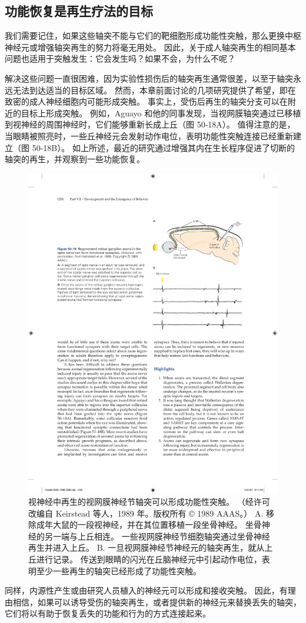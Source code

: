 \subsection{功能恢复是再生疗法的目标}
我们需要记住，如果这些轴突不能与它们的靶细胞形成功能性突触，那么更换中枢神经元或增强轴突再生的努力将毫无用处。 因此，关于成人轴突再生的相同基本问题也适用于突触发生：它会发生吗？如果不会，为什么不呢？

解决这些问题一直很困难，因为实验性损伤后的轴突再生通常很差，以至于轴突永远无法到达适当的目标区域。 然而，本章前面讨论的几项研究提供了希望，即在致密的成人神经细胞内可能形成突触。 事实上，受伤后再生的轴突分支可以在附近的目标上形成突触。 例如，Aguayo 和他的同事发现，当视网膜轴突通过已移植到视神经的周围神经时，它们能够重新长成上丘（图 50-18A）。 
值得注意的是，当眼睛被照亮时，一些丘神经元会发射动作电位，表明功能性突触连接已经重新建立（图 50-18B）。 如上所述，最近的研究通过增强其内在生长程序促进了切断的轴突的再生，并观察到一些功能恢复。

\begin{figure}[htbp]
	\centering
	\includegraphics[width=0.55\linewidth]{chap50/fig_50_18}
	\caption{视神经中再生的视网膜神经节轴突可以形成功能性突触。 （经许可改编自 Keirstead 等人，1989 年。版权所有 © 1989 AAAS。） A. 移除成年大鼠的一段视神经，并在其位置移植一段坐骨神经。 坐骨神经的另一端与上丘相连。 一些视网膜神经节细胞轴突通过坐骨神经再生并进入上丘。 B. 一旦视网膜神经节神经元的轴突再生，就从上丘进行记录。 传送到眼睛的闪光在丘脑神经元中引起动作电位，表明至少一些再生的轴突已经形成了功能性突触。}
	\label{fig:50_18}
\end{figure}

同样，内源性产生或由研究人员植入的神经元可以形成和接收突触。 因此，有理由相信，如果可以诱导受伤的轴突再生，或者提供新的神经元来替换丢失的轴突，它们将以有助于恢复丢失的功能和行为的方式连接起来。

